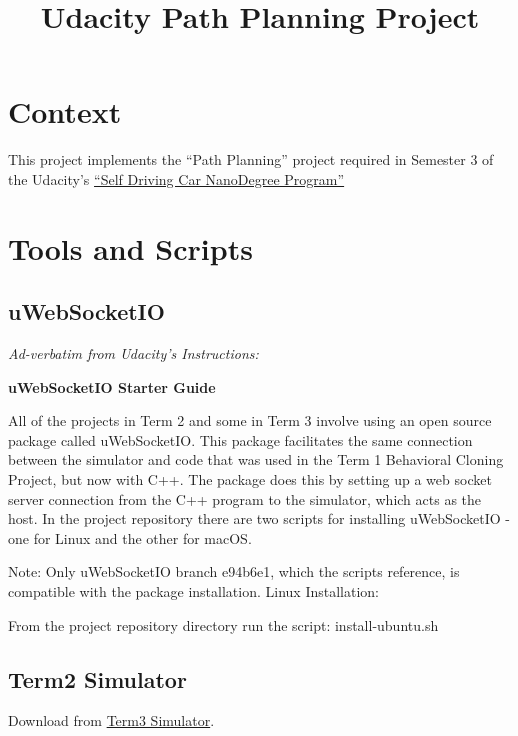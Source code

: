 \documentclass{article}
\title{Udacity Path Planning Project}
\date{\vspace{-5ex}}
\begin{document}
\maketitle


\section{Context}
This project implements the “Path Planning” project required in Semester 3 of the Udacity’s \href{https://de.udacity.com/course/self-driving-car-engineer-nanodegree--nd013}{“Self Driving Car NanoDegree Program”} 


\section{Tools and Scripts}

\subsection{uWebSocketIO}


\textit{Ad-verbatim from Udacity's Instructions:}

\textbf{uWebSocketIO Starter Guide}

All of the projects in Term 2 and some in Term 3 involve using an open source package called uWebSocketIO. This package facilitates the same connection between the simulator and code that was used in the Term 1 Behavioral Cloning Project, but now with C++. The package does this by setting up a web socket server connection from the C++ program to the simulator, which acts as the host. In the project repository there are two scripts for installing uWebSocketIO - one for Linux and the other for macOS.

Note: Only uWebSocketIO branch e94b6e1, which the scripts reference, is compatible with the package installation. Linux Installation:

From the project repository directory run the script: install-ubuntu.sh

\subsection{Term2 Simulator}
Download from \href{https://github.com/udacity/CarND-Path-Planning-Project}{Term3 Simulator}.
\end{document}

